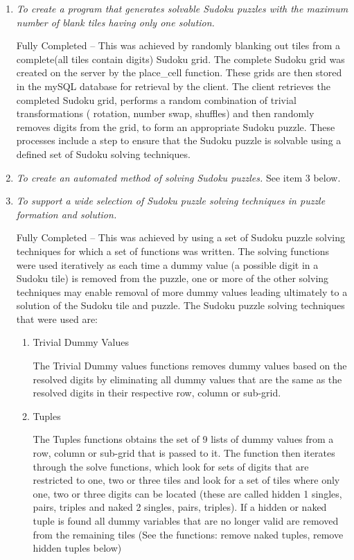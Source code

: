 \documentclass[fleqn]{article}
\begin{document}
\begin{enumerate}


\item{\textit{To create a program that generates solvable Sudoku puzzles with the maximum number of blank tiles having only one solution.}}

Fully Completed – This was achieved by randomly blanking out tiles from a complete(all tiles contain digits) Sudoku grid. The complete Sudoku grid was created on the server by the place\_cell function. These grids are then stored in the mySQL database for retrieval by the client. The client retrieves the completed Sudoku grid, performs a random combination of trivial transformations ( rotation, number swap, shuffles) and then randomly removes digits from the grid, to form an appropriate Sudoku puzzle. These processes include a step to ensure that the Sudoku puzzle is solvable using a defined set of Sudoku solving techniques.

\item{\textit{To create an automated method of solving Sudoku puzzles.}}
See item 3 below.
\item{\textit{To support a wide selection of Sudoku puzzle solving techniques in puzzle formation and solution.}}

Fully Completed – This was achieved by using a set of Sudoku puzzle solving techniques for which a set of functions was written. The solving functions were used iteratively as each time a dummy value (a possible digit in a Sudoku tile) is removed from the puzzle, one or more of the other solving techniques may enable removal of more dummy values leading ultimately to a solution of the Sudoku tile and puzzle.  
The Sudoku puzzle solving techniques that were used are:
\begin{enumerate}

\item{Trivial Dummy Values}

The Trivial Dummy values functions removes dummy values based on the resolved digits by eliminating all dummy values that are the same as the resolved digits in their respective row, column or sub-grid.

\item{Tuples}

The Tuples functions obtains the set of 9 lists of dummy values from a row, column or sub-grid that is passed to it. The function then iterates through the solve functions, which look for sets of digits that are restricted to one, two or three tiles and look for a set of tiles where only one, two or three digits can be located (these are called hidden 1 singles, pairs, triples and naked 2 singles, pairs, triples). If a hidden or naked tuple is found all dummy variables that are no longer valid are removed from the remaining tiles (See the functions: remove naked tuples, remove hidden tuples below)


\end{enumerate}
\end{enumerate}
\end{document}
